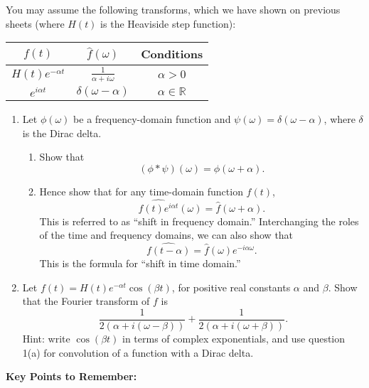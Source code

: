 \documentclass{article}
\begin{document}
You may assume the following transforms, which we have shown on previous sheets (where $H(t)$ is the Heaviside step function):

\begin{center}
\begin{tabular}{c|c|c}
	$f(t)$ & $\hat{f}(\omega)$ & Conditions\\ \hline
	$H(t)e^{-\alpha t}$ & $\frac{1}{\alpha+i\omega}$ & $\alpha>0$\\ \hline
	$e^{i\alpha t}$ & $\delta(\omega-\alpha)$ & $\alpha\in\mathbb{R}$
\end{tabular}
\end{center}

\begin{enumerate}
	\item Let $\phi(\omega)$ be a frequency-domain function and $\psi(\omega)=\delta(\omega-\alpha)$, where $\delta$ is the Dirac delta.
		\begin{enumerate}
			\item Show that
				\[(\phi \ast \psi)(\omega)=\phi(\omega+\alpha).\]
			\item Hence show that for any time-domain function $f(t)$,
				\[\widehat{f(t)e^{i\alpha t}}(\omega) = \hat{f}(\omega+\alpha).\]
				This is referred to as ``shift in frequency domain.'' Interchanging the roles of the time and frequency domains, we can also show that
				\[\widehat{f(t-\alpha)}=\hat{f}(\omega)e^{-i\alpha\omega}.\]
				This is the formula for ``shift in time domain.''
		\end{enumerate}
	\item Let $f(t)=H(t)e^{-\alpha t}\cos(\beta t)$, for positive real constants $\alpha$ and $\beta$. Show that the Fourier transform of $f$ is
		\[\frac{1}{2(\alpha+i(\omega-\beta))}+\frac{1}{2(\alpha+i(\omega+\beta))}.\]
		Hint: write $\cos(\beta t)$ in terms of complex exponentials, and use question 1(a) for convolution of a function with a Dirac delta.
\end{enumerate}


















\clearpage




{\bf Key Points to Remember:}

\vspace{5mm}
\end{document}

